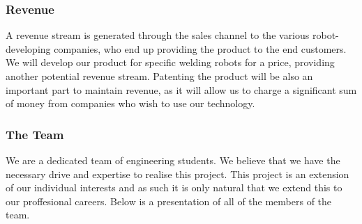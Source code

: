 \subsubsection{Revenue}
A revenue stream is generated through the sales channel to the various robot-developing companies, who end up providing the product to the end customers.
We will develop our product for specific welding robots for a price, providing another potential revenue stream. 
Patenting the product will be also an important part to maintain revenue, as it will allow us to charge a significant sum of money from companies who wish to use our technology.

\subsubsection{The Team}
We are a dedicated team of engineering students. We believe that we have the necessary drive and expertise to realise this project. This project is an extension of our individual interests and as such it is only natural that we extend this to our proffesional careers. Below is a presentation of all of the members of the team.

